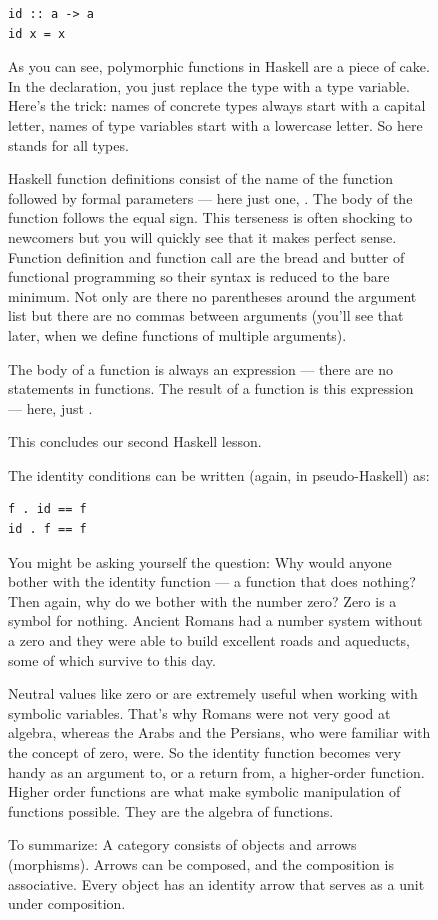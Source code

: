 \begin{figure}
\begin{Verbatim}
id :: a -> a
id x = x
\end{Verbatim}
As you can see, polymorphic functions in Haskell are a piece of cake. In
the declaration, you just replace the type with a type variable. Here's
the trick: names of concrete types always start with a capital letter,
names of type variables start with a lowercase letter. So here
 stands for all types.

Haskell function definitions consist of the name of the function
followed by formal parameters --- here just one, . The body of
the function follows the equal sign. This terseness is often shocking to
newcomers but you will quickly see that it makes perfect sense. Function
definition and function call are the bread and butter of functional
programming so their syntax is reduced to the bare minimum. Not only are
there no parentheses around the argument list but there are no commas
between arguments (you'll see that later, when we define functions of
multiple arguments).

The body of a function is always an expression --- there are no
statements in functions. The result of a function is this expression ---
here, just .

This concludes our second Haskell lesson.

The identity conditions can be written (again, in pseudo-Haskell) as:

\begin{Verbatim}
f . id == f
id . f == f
\end{Verbatim}
You might be asking yourself the question: Why would anyone bother with
the identity function --- a function that does nothing? Then again, why
do we bother with the number zero? Zero is a symbol for nothing. Ancient
Romans had a number system without a zero and they were able to build
excellent roads and aqueducts, some of which survive to this day.

Neutral values like zero or  are extremely useful when
working with symbolic variables. That's why Romans were not very good at
algebra, whereas the Arabs and the Persians, who were familiar with the
concept of zero, were. So the identity function becomes very handy as an
argument to, or a return from, a higher-order function. Higher order
functions are what make symbolic manipulation of functions possible.
They are the algebra of functions.

To summarize: A category consists of objects and arrows (morphisms).
Arrows can be composed, and the composition is associative. Every object
has an identity arrow that serves as a unit under composition.


\end{figure}
